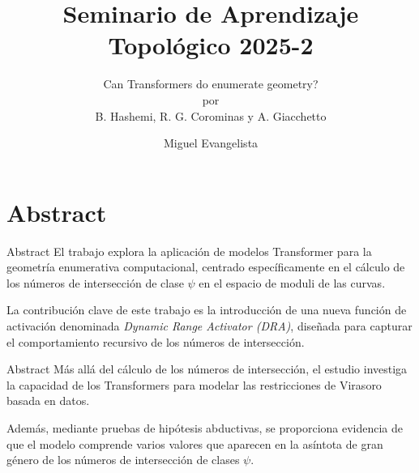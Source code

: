 \documentclass{beamer}
\title{Seminario de Aprendizaje Topológico 2025-2}
\subtitle{Can Transformers do enumerate geometry? \\ por \\ B. Hashemi, R. G. Corominas y A. Giacchetto} %
\author{Miguel Evangelista}
\begin{document}
\frenchspacing


  \frame{\maketitle}


\section{Abstract}

\begin{frame}{Abstract}
    El trabajo explora la aplicación de modelos Transformer para la geometría enumerativa computacional, centrado específicamente en el cálculo de los números de intersección de clase $\psi$ en el espacio de moduli de las curvas.
    \newline
    \pause

    La contribución clave de este trabajo es la introducción de una nueva función de activación denominada \textit{Dynamic Range Activator (DRA)}, diseñada para capturar el comportamiento recursivo de los números de intersección.
    
\end{frame}

\begin{frame}{Abstract}
    Más allá del cálculo de los números de intersección, el estudio investiga la capacidad de los Transformers para modelar las restricciones de Virasoro basada en datos. 
    \newline
    \pause

    
    Además, mediante pruebas de hipótesis abductivas, se proporciona evidencia de que el modelo comprende varios valores que aparecen en la asíntota de gran género de los números de intersección de clases $\psi$.
    
\end{frame}
\end{document}
